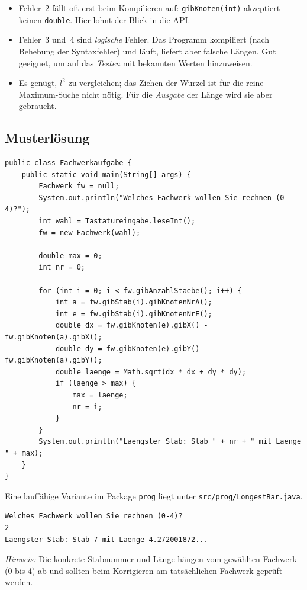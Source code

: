 \documentclass[
	fontsize=12pt,          %
	paper=a4,               %
	numbers=noenddot,       %
	listof=totoc,           %
	listof=entryprefix,     %
	listof=nochaptergap,    %
	bibliography=totoc,     %
	parskip=half            %
	openany                 %
]{scrbook}
\begin{document}
\begin{hinweis}
	\begin{itemize}[nosep]
		\item Fehler~2 fällt oft erst beim Kompilieren auf: \texttt{gibKnoten(int)} akzeptiert keinen \texttt{double}. Hier lohnt der Blick in die API.
		\item Fehler~3 und~4 sind \emph{logische} Fehler. Das Programm kompiliert (nach Behebung der Syntaxfehler) und läuft, liefert aber falsche Längen. Gut geeignet, um auf das \emph{Testen} mit bekannten Werten hinzuweisen.
		\item Es genügt, $l^2$ zu vergleichen; das Ziehen der Wurzel ist für die reine Maximum-Suche nicht nötig. Für die \emph{Ausgabe} der Länge wird sie aber gebraucht.
	\end{itemize}
\end{hinweis}

\subsection*{Musterlösung}

\begin{loesung}
\begin{lstlisting}
public class Fachwerkaufgabe {
    public static void main(String[] args) {
        Fachwerk fw = null;
        System.out.println("Welches Fachwerk wollen Sie rechnen (0-4)?");
        int wahl = Tastatureingabe.leseInt();
        fw = new Fachwerk(wahl);

        double max = 0;
        int nr = 0;

        for (int i = 0; i < fw.gibAnzahlStaebe(); i++) {
            int a = fw.gibStab(i).gibKnotenNrA();
            int e = fw.gibStab(i).gibKnotenNrE();
            double dx = fw.gibKnoten(e).gibX() - fw.gibKnoten(a).gibX();
            double dy = fw.gibKnoten(e).gibY() - fw.gibKnoten(a).gibY();
            double laenge = Math.sqrt(dx * dx + dy * dy);
            if (laenge > max) {
                max = laenge;
                nr = i;
            }
        }
        System.out.println("Laengster Stab: Stab " + nr + " mit Laenge " + max);
    }
}
\end{lstlisting}
\end{loesung}

Eine lauffähige Variante im Package \texttt{prog} liegt unter \texttt{src/prog/LongestBar.java}.

\begin{beispiel}
\begin{verbatim}
Welches Fachwerk wollen Sie rechnen (0-4)?
2
Laengster Stab: Stab 7 mit Laenge 4.272001872...
\end{verbatim}
\emph{Hinweis:} Die konkrete Stabnummer und Länge hängen vom gewählten Fachwerk
(0 bis 4) ab und sollten beim Korrigieren am tatsächlichen Fachwerk geprüft werden.
\end{beispiel}
\end{document}
